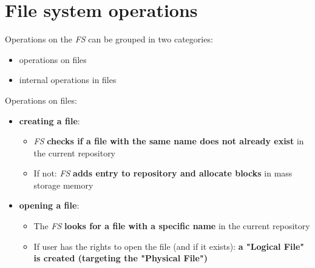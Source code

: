 \documentclass{beamer}[10pt, usepdftitle=false, handout]
\begin{document}
{	\section{File system operations}
	\begin{frame}
	Operations on the \textit{FS} can be grouped in two categories:
	\vspace*{1em}
	\begin{itemize}
	\item{operations on files}
	\item{internal operations in files}
	\end{itemize}		
	\vspace*{1em}	
	Operations on files:	
	\vspace*{0.5em}
	\begin{itemize}
	\item{\textbf{creating a file}:
		\begin{itemize}
		\item{\textit{FS} \textbf{checks if a file with the same name does not already exist} in the current repository}
		\item{If not: \textit{FS} \textbf{adds entry to repository and allocate blocks} in mass storage memory}
		\end{itemize}			
	}
	\item{\textbf{opening a file}:
		\begin{itemize}
			\item{The \textit{FS} \textbf{looks for a file with a specific name} in the current repository}
			\item{If user has the rights to open the file (and if it exists): \textbf{a "Logical File" is created (targeting the "Physical File")}}
		\end{itemize}
	}

	\end{itemize}		
	
	
	\end{frame}	
				
}
\end{document}
